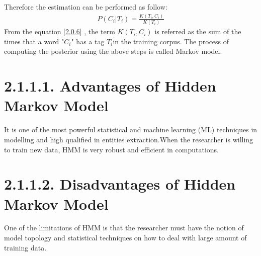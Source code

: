 Therefore the estimation can be performed as follow:
\begin{align}
P(C_{i}|T_{i}) =  \frac{K(T_{i},C_{i})}{K(T_{i})} \label{2.0.6}
\end{align}
From the equation \eqref{2.0.6} , the term $K(T_{i},C_{i})$  is referred as the sum of the times that a word "$C_{i}$" has a tag $T_{i}$in the training corpus.
The process of computing the posterior using the above steps is called Markov model.


\section*{2.1.1.1. Advantages of Hidden Markov Model}

It is one of the most powerful statistical and machine learning (ML) techniques in modelling and high qualified in entities extraction.When the researcher is willing to train new data, HMM is very robust and efficient in computations.
\section*{2.1.1.2. Disadvantages of Hidden Markov Model}
One of the limitations of HMM is that the researcher must have the notion of model topology and statistical techniques on how to deal with large amount of training data.

